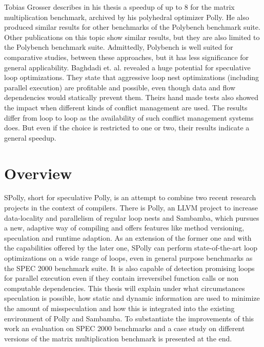 Tobias Grosser describes in his thesis\cite{grosser:thesis} a speedup of up to
$8$ for the matrix multiplication benchmark, archived by his polyhedral optimizer 
Polly\cite{grosser.11.impact}. He also produced similar results for other
benchmarks of the Polybench\cite{Polybench:Online} benchmark suite. 
Other publications on this 
topic\cite{Bondhugula:2008:PAP:1379022.1375595,BCBPR10,Pradelle:2012:PPB:2086696.2086718} 
show similar results, but they are also limited to the Polybench benchmark suite.
Admittedly, Polybench is well suited for comparative studies, between these 
approaches, but it has less significance for general applicability. 
Baghdadi et. al.\cite{BCBPR10} revealed a huge potential for speculative loop 
optimizations. They state that aggressive loop nest optimizations (including 
parallel execution) are profitable and possible, even though data and flow 
dependencies would statically prevent them. 
Theirs hand made tests also showed 
the impact when different kinds of conflict management are used. 
The results differ from loop to loop as the availability of such conflict 
management systems does. But even if the choice is restricted to one or two, 
their results indicate a general speedup. 




\section{Overview}

SPolly, short for speculative Polly, is an attempt to combine two recent research 
projects in the context of compilers. 
There is Polly, an LLVM project to increase data-locality
and parallelism of regular loop nests and Sambamba, which 
pursues a new, adaptive way of compiling and offers features like method 
versioning, speculation and runtime adaption. As an extension of the former one
and with the capabilities offered by the later one,
SPolly can perform state-of-the-art loop optimizations on a wide range of loops,
even in general purpose benchmarks as the SPEC 2000 benchmark suite. It is also
capable of detection promising loops for parallel execution even if they contain 
irreversibel function calls or non computable dependencies.
This thesis will explain under what circumstances speculation is possible,
how static and dynamic information are used to minimize the amount of
misspeculation and how this is integrated into the existing environment of 
Polly and Sambamba. To substantiate the improvements of this work an evaluation on 
SPEC 2000 benchmarks and a case study on different versions of
the matrix multiplication benchmark is presented at the end.

